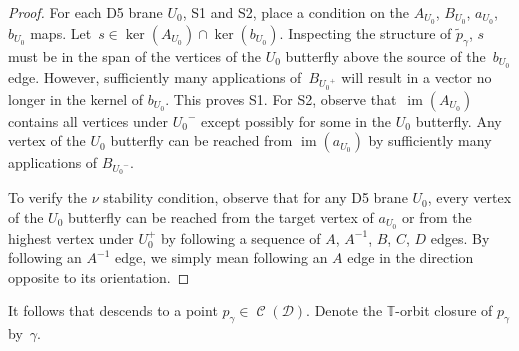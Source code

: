 \documentclass[pdftex]{sigma}
\numberwithin{equation}{section}
\newcommand{\brane}{\mathcal D}
\newcommand{\torus}{\mathbb T}
\newcommand{\MM}{\mathbb M}
\newcommand{\prequot}{\widetilde \MM^s}
\DeclareMathOperator{\bowvar}{\mathcal C}
\DeclareMathOperator{\im}{im}
\begin{document}
\begin{proof}
For each D5 brane $U_0$, S1 and S2, place a condition on the $A_{U_0}$, $B_{U_0}$, $a_{U_0}$, $b_{U_0}$ maps. Let~${s \in \ker(A_{U_0}) \cap \ker(b_{U_0})}$. Inspecting the structure of $\tilde{p}_\gamma$, $s$ must be in the span of the vertices of the $U_0$ butterfly above the source of the~$b_{U_0}$ edge. However, sufficiently many applications of~$B_{{U_0}^+}$ will result in a vector no longer in the kernel of $b_{U_0}$. This proves S1. For S2, observe that~$\im(A_{U_0})$ contains all vertices under ${U_0}^-$ except possibly for some in the $U_0$ butterfly. Any vertex of the $U_0$ butterfly can be reached from $\im(a_{U_0})$ by sufficiently many applications of $B_{{U_0}^-}$.

To verify the $\nu$ stability condition, observe that for any D5 brane $U_0$, every vertex of the $U_0$ butterfly can be reached from the target vertex of $a_{U_0}$ or from the highest vertex under $U_0^+$ by following a sequence of $A$, $A^{-1}$, $B$, $C$, $D$ edges. By following an $A^{-1}$ edge, we simply mean following an $A$ edge in the direction opposite to its orientation.
\end{proof}

It follows that \smash{$\tilde{p}_\gamma \in \prequot$} descends to a point $p_\gamma \in \bowvar(\brane)$. Denote the $\torus$-orbit closure of $p_\gamma$ by~$\gamma$.
\end{document}
